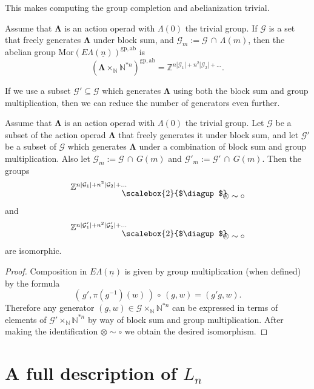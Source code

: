 \documentclass{amsbook} %
\newcommand{\ML}{\mathbf{\Lambda}}
\newcommand{\LL}{\Lambda}
\newcommand{\bigquotient}[2]{ \raisebox{0.75\height}{$#1$} \mkern-12mu\scalebox{2}{$\diagup$}\mkern-10mu \raisebox{-0.5\height}{$#2$} }
\newcommand{\ELn}{E\Lambda(\underline{n})}
\newcommand{\ab}{\mathrm{ab}}
\newcommand{\gp}{\mathrm{gp}}
\numberwithin{section}{chapter}
\begin{document}
This makes computing the group completion and abelianization trivial. 

\begin{cor} \label{freemorgpab} Assume that $\ML$ is an action operad with $\LL(0)$ the trivial group. If $\mathcal{G}$ is a set that freely generates $\ML$ under block sum, and $\mathcal{G}_m := \mathcal{G} \, \cap \,  \Lambda(m)$, then the abelian group $\mathrm{Mor}(\ELn)^{\gp, \ab}$ is 
  \[
    (\ML \times_{\mathbb{N}} \mathbb{N}^{\ast n})^{\gp, \ab} = \mathbb{Z}^{ n|\mathcal{G}_1| + n^2 |\mathcal{G}_2| + \ldots}.
  \]
\end{cor}

If we use a subset $\mathcal{G}' \subseteq \mathcal{G}$ which generates $\ML$ using both the block sum and group multiplication, then we can reduce the number of generators even further.

\begin{cor} Assume that $\ML$ is an action operad with $\LL(0)$ the trivial group. Let $\mathcal{G}$ be a subset of the action operad $\ML$ that freely generates it under block sum, and let $\mathcal{G'}$ be a subset of $\mathcal{G}$ which generates $\ML$ under a combination of block sum and group multiplication. Also let $\mathcal{G}_m := \mathcal{G} \, \cap \,  G(m)$ and $\mathcal{G}'_m := \mathcal{G}' \, \cap \,  G(m)$. Then the groups
  \[
    \bigquotient{\mathbb{Z}^{n|\mathcal{G}_1| + n^2 |\mathcal{G}_2| + \ldots}}{\otimes \sim \circ}
  \]
  and
  \[
    \bigquotient{\mathbb{Z}^{n|\mathcal{G}'_1| + n^2 |\mathcal{G}'_2| + \ldots}}{\otimes \sim \circ}
  \]
are isomorphic.
\end{cor}
\begin{proof}
Composition in $\ELn$ is given by group multiplication (when defined) by the formula
  \[
    \left( \, g', \pi\left(g^{-1}\right)(w) \, \right) \, \circ \, (g, w) = \left(g'g, w\right).
  \]
Therefore any generator $(g, w) \in \mathcal{G} \times_{\mathbb{N}} \mathbb{N}^{\ast n}$ can be expressed in terms of elements of $\mathcal{G}' \times_{\mathbb{N}} \mathbb{N}^{\ast n}$ by way of block sum and group multiplication. After making the identification $\otimes \sim \circ$ we obtain the desired isomorphism.
\end{proof}

\section{A full description of \texorpdfstring{$L_n$}{L_n}}\label{full_des}
\end{document}

